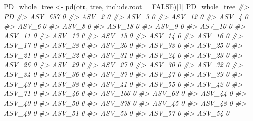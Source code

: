 \documentclass[
]{article}
\newenvironment{Shaded}{\begin{snugshade}}{\end{snugshade}}
\newcommand{\AttributeTok}[1]{\textcolor[rgb]{0.77,0.63,0.00}{#1}}
\newcommand{\CommentTok}[1]{\textcolor[rgb]{0.56,0.35,0.01}{\textit{#1}}}
\newcommand{\ConstantTok}[1]{\textcolor[rgb]{0.00,0.00,0.00}{#1}}
\newcommand{\DecValTok}[1]{\textcolor[rgb]{0.00,0.00,0.81}{#1}}
\newcommand{\FunctionTok}[1]{\textcolor[rgb]{0.00,0.00,0.00}{#1}}
\newcommand{\NormalTok}[1]{#1}
\newcommand{\OtherTok}[1]{\textcolor[rgb]{0.56,0.35,0.01}{#1}}
\begin{document}
\begin{Shaded}
\begin{Highlighting}[]
\NormalTok{PD\_whole\_tree }\OtherTok{\textless{}{-}} \FunctionTok{pd}\NormalTok{(otu, tree, }\AttributeTok{include.root =} \ConstantTok{FALSE}\NormalTok{)[}\DecValTok{1}\NormalTok{]}
\NormalTok{PD\_whole\_tree}
\CommentTok{\#\textgreater{}          PD}
\CommentTok{\#\textgreater{} ASV\_657   0}
\CommentTok{\#\textgreater{} ASV\_2     0}
\CommentTok{\#\textgreater{} ASV\_3     0}
\CommentTok{\#\textgreater{} ASV\_12    0}
\CommentTok{\#\textgreater{} ASV\_4     0}
\CommentTok{\#\textgreater{} ASV\_6     0}
\CommentTok{\#\textgreater{} ASV\_8     0}
\CommentTok{\#\textgreater{} ASV\_18    0}
\CommentTok{\#\textgreater{} ASV\_9     0}
\CommentTok{\#\textgreater{} ASV\_10    0}
\CommentTok{\#\textgreater{} ASV\_11    0}
\CommentTok{\#\textgreater{} ASV\_13    0}
\CommentTok{\#\textgreater{} ASV\_15    0}
\CommentTok{\#\textgreater{} ASV\_14    0}
\CommentTok{\#\textgreater{} ASV\_16    0}
\CommentTok{\#\textgreater{} ASV\_17    0}
\CommentTok{\#\textgreater{} ASV\_28    0}
\CommentTok{\#\textgreater{} ASV\_20    0}
\CommentTok{\#\textgreater{} ASV\_33    0}
\CommentTok{\#\textgreater{} ASV\_25    0}
\CommentTok{\#\textgreater{} ASV\_21    0}
\CommentTok{\#\textgreater{} ASV\_22    0}
\CommentTok{\#\textgreater{} ASV\_31    0}
\CommentTok{\#\textgreater{} ASV\_24    0}
\CommentTok{\#\textgreater{} ASV\_23    0}
\CommentTok{\#\textgreater{} ASV\_26    0}
\CommentTok{\#\textgreater{} ASV\_29    0}
\CommentTok{\#\textgreater{} ASV\_27    0}
\CommentTok{\#\textgreater{} ASV\_30    0}
\CommentTok{\#\textgreater{} ASV\_32    0}
\CommentTok{\#\textgreater{} ASV\_34    0}
\CommentTok{\#\textgreater{} ASV\_36    0}
\CommentTok{\#\textgreater{} ASV\_37    0}
\CommentTok{\#\textgreater{} ASV\_47    0}
\CommentTok{\#\textgreater{} ASV\_39    0}
\CommentTok{\#\textgreater{} ASV\_43    0}
\CommentTok{\#\textgreater{} ASV\_38    0}
\CommentTok{\#\textgreater{} ASV\_41    0}
\CommentTok{\#\textgreater{} ASV\_55    0}
\CommentTok{\#\textgreater{} ASV\_42    0}
\CommentTok{\#\textgreater{} ASV\_71    0}
\CommentTok{\#\textgreater{} ASV\_46    0}
\CommentTok{\#\textgreater{} ASV\_166   0}
\CommentTok{\#\textgreater{} ASV\_63    0}
\CommentTok{\#\textgreater{} ASV\_44    0}
\CommentTok{\#\textgreater{} ASV\_40    0}
\CommentTok{\#\textgreater{} ASV\_50    0}
\CommentTok{\#\textgreater{} ASV\_378   0}
\CommentTok{\#\textgreater{} ASV\_45    0}
\CommentTok{\#\textgreater{} ASV\_48    0}
\CommentTok{\#\textgreater{} ASV\_49    0}
\CommentTok{\#\textgreater{} ASV\_51    0}
\CommentTok{\#\textgreater{} ASV\_53    0}
\CommentTok{\#\textgreater{} ASV\_57    0}
\CommentTok{\#\textgreater{} ASV\_54    0}

\end{Highlighting}
\end{Shaded}
\end{document}
